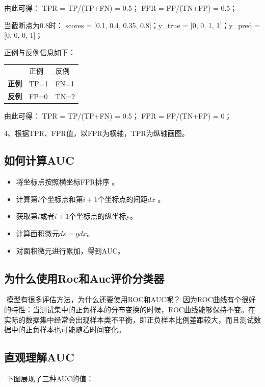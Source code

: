由此可得： TPR = TP/(TP+FN) = 0.5； FPR = FP/(TN+FP) = 0.5；

当截断点为0.8时： scores = {[}0.1, 0.4, 0.35, 0.8{]}；y\_true = {[}0, 0,
1, 1{]}；y\_pred = {[}0, 0, 0, 1{]}；

正例与反例信息如下：

\begin{longtable}[]{ lll }
& 正例 & 反例\tabularnewline
\textbf{正例} & TP=1 & FN=1\tabularnewline
\textbf{反例} & FP=0 & TN=2\tabularnewline
\end{longtable}

由此可得： TPR = TP/(TP+FN) = 0.5； FPR = FP/(TN+FP) = 0；

4、根据TPR、FPR值，以FPR为横轴，TPR为纵轴画图。

\subsection{如何计算AUC}\label{ux5982ux4f55ux8ba1ux7b97auc}

\begin{itemize}
\item
  将坐标点按照横坐标FPR排序 。
\item
  计算第$i$个坐标点和第$i+1$个坐标点的间距$dx$ 。
\item
  获取第$i$或者$i+1$个坐标点的纵坐标y。
\item
  计算面积微元$ds=ydx$。
\item
  对面积微元进行累加，得到AUC。
\end{itemize}

\subsection{为什么使用Roc和Auc评价分类器}\label{ux4e3aux4ec0ux4e48ux4f7fux7528rocux548caucux8bc4ux4ef7ux5206ux7c7bux5668}

​ 模型有很多评估方法，为什么还要使用ROC和AUC呢？ ​
因为ROC曲线有个很好的特性：当测试集中的正负样本的分布变换的时候，ROC曲线能够保持不变。在实际的数据集中经常会出现样本类不平衡，即正负样本比例差距较大，而且测试数据中的正负样本也可能随着时间变化。

\subsection{直观理解AUC}\label{ux76f4ux89c2ux7406ux89e3auc}

​ 下图展现了三种AUC的值：


